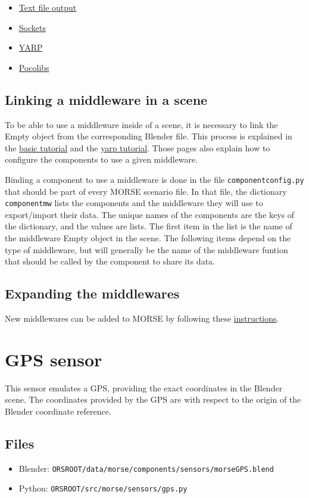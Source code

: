 \documentclass[twoside,a4paper,10pt]{report}
\newcommand{\dokutitlelevelone}[1]{\chapter{#1}}
\newcommand{\dokutitleleveltwo}[1]{\section{#1}}
\newcommand{\dokumonospace}[1]{\texttt{#1}}
\newcommand{\dokuitem}{\item}
\begin{document}
\begin{itemize}
\dokuitem  \hyperref[1cb251ec0d568de6a929b520c4aed8d1]{ Text file output}
\dokuitem  \hyperref[61f2529360aec54f5dc9804b842cf3fa]{ Sockets}
\dokuitem  \hyperref[ec46d0b85077d7a7fe8da2e2b4c70462]{ YARP}
\dokuitem  \hyperref[15f13a3fccdd1ef095539316b61c03c8]{ Pocolibs}
\end{itemize}

\dokutitleleveltwo{Linking a middleware in a scene}
\label{5ded332fc3ba470e4d4d290c9bf26a19}%

To be able to use a middleware inside of a scene, it is necessary to link the Empty object from the corresponding Blender file. This process is explained in the \hyperref[0575c8d592fb7b088226750aceec2b4e]{ basic tutorial} and the \hyperref[1dd029a60f7f3dd1deaf993ce4538edf]{ yarp tutorial}. Those pages also explain how to configure the components to use a given middleware.

Binding a component to use a middleware is done in the file \dokumonospace{component{\textunderscore}config.py} that should be part of every MORSE scenario file. In that file, the dictionary \dokumonospace{component{\textunderscore}mw} lists the components and the middleware they will use to export/import their data. The unique names of the components are the keys of the dictionary, and the values are lists. The first item in the list is the name of the middleware Empty object in the scene. The following items depend on the type of middleware, but will generally be the name of the middleware funtion that should be called by the component to share its data.


\dokutitleleveltwo{Expanding the middlewares}
\label{b3a6313d335453f4c7ad970485acc1a1}%

New middlewares can be added to MORSE by following these \hyperref[6a8f80abb2f3d2288ad863e67f2499a4]{ instructions}.


\dokutitlelevelone{GPS sensor}
\label{fa7c7c892a3b7d9c01ef03ed367274b8}%
\label{11648e4e66e7ed6a86cb7f1d0cf604fe}%

This sensor emulates a GPS, providing the exact coordinates in the Blender scene. The coordinates provided by the GPS are with respect to the origin of the Blender coordinate reference.


\dokutitleleveltwo{Files}
\label{45b963397aa40d4a0063e0d85e4fe7a1}%

\begin{itemize}
\dokuitem  Blender: \dokumonospace{{\textdollar}ORS{\textunderscore}ROOT/data/morse/components/sensors/morse{\textunderscore}GPS.blend}
\dokuitem  Python: \dokumonospace{{\textdollar}ORS{\textunderscore}ROOT/src/morse/sensors/gps.py}
\end{itemize}
\end{document}
